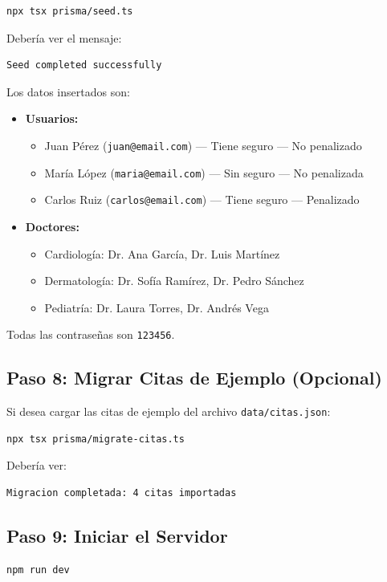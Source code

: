 \documentclass[12pt,a4paper]{article}
\begin{document}
\begin{lstlisting}[language=bash]
npx tsx prisma/seed.ts
\end{lstlisting}

Debería ver el mensaje:
\begin{lstlisting}
Seed completed successfully
\end{lstlisting}

Los datos insertados son:

\begin{itemize}
    \item \textbf{Usuarios:}
    \begin{itemize}
        \item Juan Pérez (\texttt{juan@email.com}) --- Tiene seguro --- No penalizado
        \item María López (\texttt{maria@email.com}) --- Sin seguro --- No penalizada
        \item Carlos Ruiz (\texttt{carlos@email.com}) --- Tiene seguro --- Penalizado
    \end{itemize}
    \item \textbf{Doctores:}
    \begin{itemize}
        \item Cardiología: Dr. Ana García, Dr. Luis Martínez
        \item Dermatología: Dr. Sofía Ramírez, Dr. Pedro Sánchez
        \item Pediatría: Dr. Laura Torres, Dr. Andrés Vega
    \end{itemize}
\end{itemize}

Todas las contraseñas son \texttt{123456}.

\subsection{Paso 8: Migrar Citas de Ejemplo (Opcional)}
Si desea cargar las citas de ejemplo del archivo \texttt{data/citas.json}:

\begin{lstlisting}[language=bash]
npx tsx prisma/migrate-citas.ts
\end{lstlisting}

Debería ver:
\begin{lstlisting}
Migracion completada: 4 citas importadas
\end{lstlisting}

\subsection{Paso 9: Iniciar el Servidor}
\begin{lstlisting}[language=bash]
npm run dev
\end{lstlisting}
\end{document}

